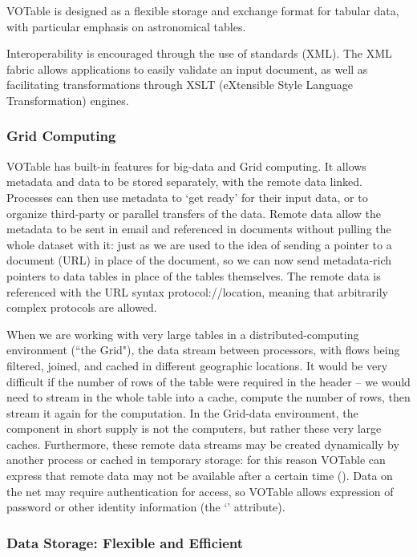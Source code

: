 VOTable is designed as a flexible storage and exchange format for
tabular data, with particular emphasis on astronomical tables.

Interoperability is encouraged through the use of standards (XML).
The XML fabric
allows applications to easily validate an input document, as well as
facilitating transformations through XSLT (eXtensible Style Language
Transformation) engines.

\subsubsection*{Grid Computing}

VOTable has built-in features for big-data and Grid computing. It
allows metadata and data to be stored separately, with the remote
data linked. %
Processes can then use
metadata to `get ready' for their input data, or to organize
third-party or parallel transfers of the data. Remote data allow the
metadata to be sent in email and referenced in documents without
pulling the whole dataset with it: just as we are used to the idea of
sending a pointer to a document (URL) in place of the document, so we
can now send metadata-rich pointers to data tables in place of the
tables themselves. The remote data is referenced with the URL syntax
{{\sf protocol://location}},
meaning that arbitrarily complex protocols are allowed.

When we are working with very large tables in a
distributed-computing environment (``the Grid"), the data
stream between processors, with flows being filtered, joined, and
cached in different geographic locations. It would be very difficult
if the number of rows of the table were required in the header --
we would need to stream in the whole table into a cache, compute the
number of rows, then stream it again for the computation. In the
Grid-data environment, the component in short supply is not the
computers, but rather these very large caches. Furthermore, these
remote data streams may be created dynamically by another process or
cached in temporary storage: for this reason VOTable can express that
remote data may not be available after a certain time ().
Data on the net may require authentication for access, so VOTable
allows expression of password or other identity information (the
`{}'
attribute).

\subsubsection*{Data Storage: Flexible and Efficient}

